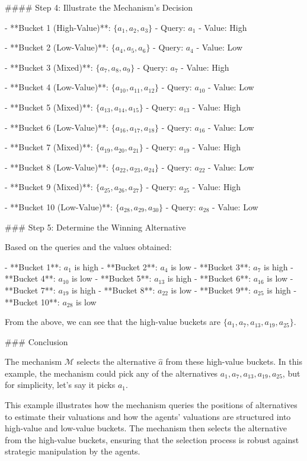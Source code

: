 #### Step 4: Illustrate the Mechanism's Decision

- **Bucket 1 (High-Value)**: \( \{a_1, a_2, a_3\} \)
  - Query: \( a_1 \)
  - Value: High

- **Bucket 2 (Low-Value)**: \( \{a_4, a_5, a_6\} \)
  - Query: \( a_4 \)
  - Value: Low

- **Bucket 3 (Mixed)**: \( \{a_7, a_8, a_9\} \)
  - Query: \( a_7 \)
  - Value: High

- **Bucket 4 (Low-Value)**: \( \{a_{10}, a_{11}, a_{12}\} \)
  - Query: \( a_{10} \)
  - Value: Low

- **Bucket 5 (Mixed)**: \( \{a_{13}, a_{14}, a_{15}\} \)
  - Query: \( a_{13} \)
  - Value: High

- **Bucket 6 (Low-Value)**: \( \{a_{16}, a_{17}, a_{18}\} \)
  - Query: \( a_{16} \)
  - Value: Low

- **Bucket 7 (Mixed)**: \( \{a_{19}, a_{20}, a_{21}\} \)
  - Query: \( a_{19} \)
  - Value: High

- **Bucket 8 (Low-Value)**: \( \{a_{22}, a_{23}, a_{24}\} \)
  - Query: \( a_{22} \)
  - Value: Low

- **Bucket 9 (Mixed)**: \( \{a_{25}, a_{26}, a_{27}\} \)
  - Query: \( a_{25} \)
  - Value: High

- **Bucket 10 (Low-Value)**: \( \{a_{28}, a_{29}, a_{30}\} \)
  - Query: \( a_{28} \)
  - Value: Low

### Step 5: Determine the Winning Alternative

Based on the queries and the values obtained:

- **Bucket 1**: \( a_1 \) is high
- **Bucket 2**: \( a_4 \) is low
- **Bucket 3**: \( a_7 \) is high
- **Bucket 4**: \( a_{10} \) is low
- **Bucket 5**: \( a_{13} \) is high
- **Bucket 6**: \( a_{16} \) is low
- **Bucket 7**: \( a_{19} \) is high
- **Bucket 8**: \( a_{22} \) is low
- **Bucket 9**: \( a_{25} \) is high
- **Bucket 10**: \( a_{28} \) is low

From the above, we can see that the high-value buckets are \( \{a_1, a_7, a_{13}, a_{19}, a_{25}\} \).

### Conclusion

The mechanism \( \mathcal{M} \) selects the alternative \( \widehat{a} \) from these high-value buckets. In this example, the mechanism could pick any of the alternatives \( a_1, a_7, a_{13}, a_{19}, a_{25} \), but for simplicity, let's say it picks \( a_1 \).

This example illustrates how the mechanism queries the positions of alternatives to estimate their valuations and how the agents' valuations are structured into high-value and low-value buckets. The mechanism then selects the alternative from the high-value buckets, ensuring that the selection process is robust against strategic manipulation by the agents.
